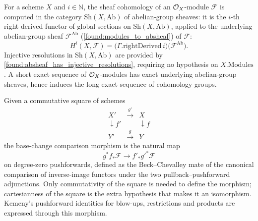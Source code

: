 \begin{definition}
  \leanok
  \label{def:peer_scheme_hmodule}
  For a scheme \(X\) and \(i\in\mathbb N\), the sheaf cohomology of an
  \(\mathcal{O}_X\)-module \(\mathcal F\) is computed in the category
  \(\mathrm{Sh}(X,\mathrm{Ab})\) of abelian-group sheaves: it is the \(i\)-th
  right-derived functor of global sections on \(\mathrm{Sh}(X,\mathrm{Ab})\),
  applied to the underlying abelian-group sheaf
  \(\mathcal F^{\mathrm{Ab}}\) (\cref{found:modules_to_absheaf}) of
  \(\mathcal F\):
  \[
    H^i(X,\mathcal F)=\bigl(\Gamma.\mathrm{rightDerived}\,i\bigr)\bigl(\mathcal F^{\mathrm{Ab}}\bigr).
  \]
  Injective resolutions in \(\mathrm{Sh}(X,\mathrm{Ab})\) are provided by
  \cref{found:absheaf_has_injective_resolutions}, requiring no hypothesis on
  \(X.\mathrm{Modules}\).  A short exact sequence of \(\mathcal{O}_X\)-modules has exact
  underlying abelian-group sheaves, hence induces the long exact sequence of
  cohomology groups.
\end{definition}

\begin{definition}
  \leanok
  \label{def:peer_affine_pushforward_base_change}
  Given a commutative square of schemes
  \[
    \begin{array}{ccc}
      X' & \xrightarrow{\,g'\,} & X\\
      \downarrow{\scriptstyle f'} & & \downarrow{\scriptstyle f}\\
      Y' & \xrightarrow{\,g\,} & Y
    \end{array}
  \]
  the base-change comparison morphism is the natural map
  \[
    g^*f_*\mathcal F\to f'_*g'^*\mathcal F
  \]
  on degree-zero pushforwards, defined as the Beck--Chevalley mate of the
  canonical comparison of inverse-image functors under the two
  pullback--pushforward adjunctions.  Only commutativity of the square is needed
  to define the morphism; cartesianness of the square is the extra hypothesis that
  makes it an isomorphism.  Kemeny's pushforward identities for blow-ups, restrictions and products are
  expressed through this morphism.
\end{definition}

